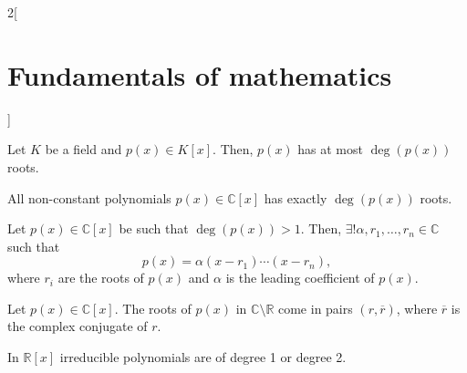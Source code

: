 \documentclass[../../../main.tex]{subfiles}
\begin{document}
\begin{multicols}{2}[\section{Fundamentals of mathematics}]
\begin{theorem}
        Let $K$ be a field and $p(x)\in K[x]$. Then, $p(x)$ has at most $\deg(p(x))$ roots.
    \end{theorem}
    \begin{theorem}
        All non-constant polynomials $p(x)\in\mathbb{C}[x]$ has exactly $\deg(p(x))$ roots.
    \end{theorem}
    \begin{corollary}
        Let $p(x)\in\mathbb{C}[x]$ be such that $\deg(p(x))>1$. Then, $\exists!\alpha,r_1,\ldots,r_n\in\mathbb{C}$ such that $$p(x)=\alpha(x-r_1)\cdots(x-r_n),$$ where $r_i$ are the roots of $p(x)$ and $\alpha$ is the leading coefficient of $p(x)$.
    \end{corollary}
    \begin{corollary}
        Let $p(x)\in\mathbb{C}[x]$. The roots of $p(x)$ in $\mathbb{C}\setminus\mathbb{R}$ come in pairs $(r,\overline{r})$, where $\overline{r}$ is the complex conjugate of $r$.
    \end{corollary}
    \begin{theorem}
        In $\mathbb{R}[x]$ irreducible polynomials are of degree 1 or degree 2.
    \end{theorem}
\end{multicols}
\end{document}
